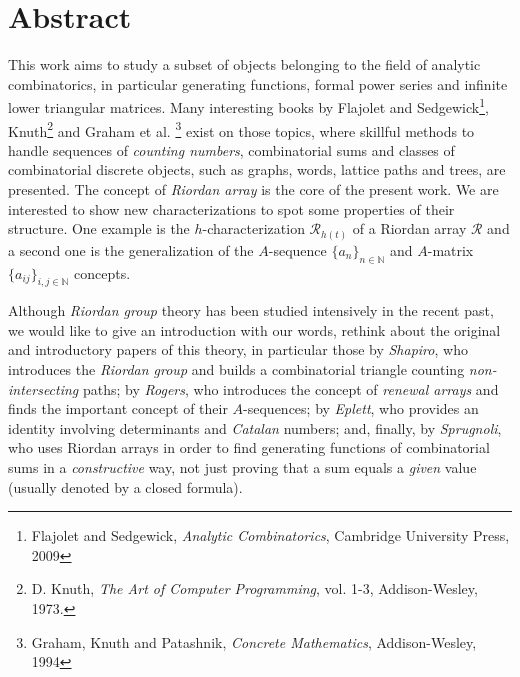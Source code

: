 \begingroup
\let\clearpage\relax
\let\cleardoublepage\relax
\let\cleardoublepage\relax

\vskip-2cm
\chapter*{Abstract}

\iftrue 
This work aims to study a subset of objects belonging to the field of analytic combinatorics,
in particular generating functions, formal power series
and infinite lower triangular matrices. Many interesting
books by Flajolet and Sedgewick\footnote{Flajolet and Sedgewick,
\emph{Analytic Combinatorics}, Cambridge University Press, 2009}, Knuth\footnote{D.
Knuth, \emph{The Art of Computer Programming}, vol.  1-3, Addison-Wesley,
1973.} and Graham et al. \footnote{Graham, Knuth and Patashnik, \emph{Concrete
Mathematics}, Addison-Wesley, 1994} exist on those topics, where skillful
methods to handle sequences of \emph{counting numbers}, combinatorial sums and
classes of combinatorial discrete objects, such as graphs, words, lattice paths
and trees, are presented. The concept of \emph{Riordan array} is
the core of the present work.  We are interested to show new characterizations
to spot some properties of their structure. One example is the
$h$-characterization $\mathcal{R}_{h(t)}$ of a Riordan array $\mathcal{R}$ and
a second one is the generalization of the $A$-sequence $\lbrace
a_{n}\rbrace_{n\in\mathbb{N}}$ and $A$-matrix $\lbrace
a_{ij}\rbrace_{i,j\in\mathbb{N}}$ concepts.

Although \emph{Riordan group} theory has been studied intensively in the recent past, we would
like to give an introduction with our words, rethink about the original and
introductory papers of this theory, in particular those by \emph{Shapiro}, who
introduces the \emph{Riordan group} and builds a combinatorial triangle
counting \emph{non-intersecting} paths; by \emph{Rogers}, who introduces the
concept of \emph{renewal arrays} and finds the important concept of their
$A$-sequences; by \emph{Eplett}, who provides an identity involving
determinants and \emph{Catalan} numbers; and, finally, by \emph{Sprugnoli}, who
uses Riordan arrays in order to find generating functions of combinatorial sums
in a \emph{constructive} way, not just proving that a sum equals a \emph{given}
value (usually denoted by a closed formula). 

